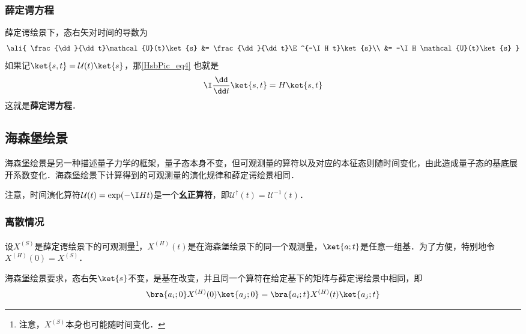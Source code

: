 \subsubsection{薛定谔方程}

薛定谔绘景下，态右矢对时间的导数为
\begin{equation}\label{HsbPic_eq4}
\ali{
    \frac{\dd}{\dd t}\mathcal{U}(t)\ket{s} &= \frac{\dd}{\dd t}\E^{-\I H t}\ket{s}\\
    &= -\I H \mathcal{U}(t)\ket{s}
}
\end{equation}
如果记$\ket{s, t}=\mathcal{U}(t)\ket{s}$，那\autoref{HsbPic_eq4} 也就是
\begin{equation}\label{HsbPic_eq5}
\I \frac{\dd}{\dd t}\ket{s, t} = H\ket{s, t}
\end{equation}
这就是\textbf{薛定谔方程}．








\subsection{海森堡绘景}

海森堡绘景是另一种描述量子力学的框架，量子态本身不变，但可观测量的算符以及对应的本征态则随时间变化，由此造成量子态的基底展开系数变化．海森堡绘景下计算得到的可观测量的演化规律和薛定谔绘景相同．

注意，时间演化算符$\mathcal{U}(t)=\exp(-\I Ht)$是一个\textbf{幺正算符}，即$\mathcal{U}^\dagger(t)=\mathcal{U}^{-1}(t)$．

\subsubsection{离散情况}



设$X^{(S)}$是薛定谔绘景下的可观测量\footnote{注意，$X^{(S)}$本身也可能随时间变化．}，$X^{(H)}(t)$是在海森堡绘景下的同一个观测量，$\ket{a; t}$是任意一组基．为了方便，特别地令$X^{(H)}(0)=X^{(S)}$．


海森堡绘景要求，态右矢$\ket{s}$不变，是基在改变，并且同一个算符在给定基下的矩阵与薛定谔绘景中相同，即
\begin{equation}\label{HsbPic_eq16}
\bra{a_i; 0}X^{(H)}(0)\ket{a_j; 0} = \bra{a_i; t}X^{(H)}(t)\ket{a_j; t}
\end{equation}

